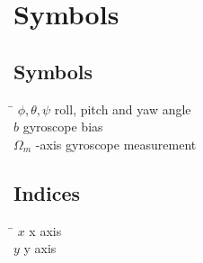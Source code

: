 \chapter*{Symbols}
\label{sec:symbols}

\section*{Symbols}

\begin{tabbing}
 \hspace*{1.6cm} \= \kill
  $\phi, \theta, \psi$    \> roll, pitch and yaw angle \\[0.5ex] 					
  $b$                     \> gyroscope bias \\[0.5ex]										
  $\Omega_m$              -axis gyroscope measurement \\[0.5ex]   		
\end{tabbing}

\section*{Indices}
\begin{tabbing}
 \hspace*{1.6cm}  \= \kill
 $x$ \> x axis \\[0.5ex]
 $y$ \> y axis \\[0.5ex]
\end{tabbing}


